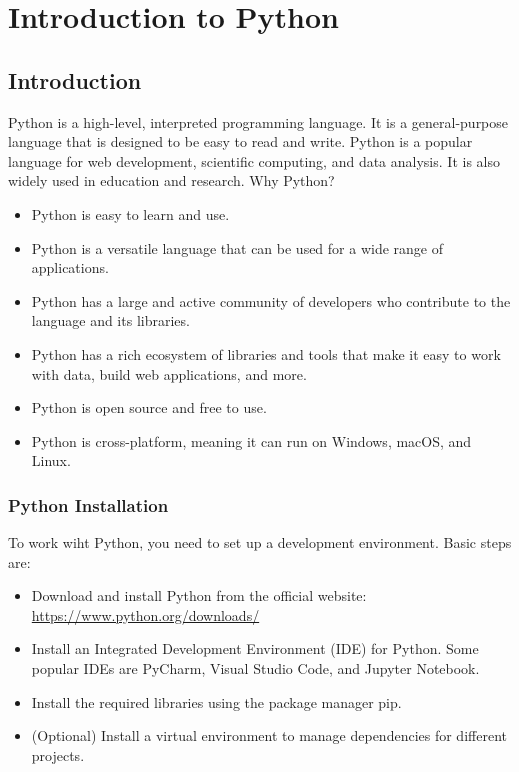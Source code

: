 
\chapter{Introduction to Python}

\section{Introduction}

Python is a high-level, interpreted programming language. It is a general-purpose language that is designed to be easy to read and write. Python is a popular language for web development, scientific computing, and data analysis. It is also widely used in education and research.
Why Python?
\begin{itemize}
    \item Python is easy to learn and use.
    \item Python is a versatile language that can be used for a wide range of applications.
    \item Python has a large and active community of developers who contribute to the language and its libraries.
    \item Python has a rich ecosystem of libraries and tools that make it easy to work with data, build web applications, and more.
    \item Python is open source and free to use.
    \item Python is cross-platform, meaning it can run on Windows, macOS, and Linux.
\end{itemize}

\subsection*{Python Installation}

To work  wiht Python, you need to set up a development environment.
Basic steps are:
\begin{itemize}
    \item Download and install Python from the official website: \url{https://www.python.org/downloads/}
    \item Install an Integrated Development Environment (IDE) for Python. Some popular IDEs are PyCharm, Visual Studio Code, and Jupyter Notebook.
    \item Install the required libraries using the package manager pip.
    \item (Optional) Install a virtual environment to manage dependencies for different projects.
\end{itemize}

